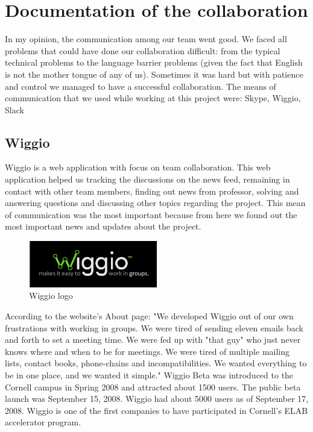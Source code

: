 \section{Documentation of the collaboration }
In my opinion, the communication among our team went good. We faced all problems that could have done our collaboration difficult: from the typical technical problems to the language barrier problems (given the fact that English is not the mother tongue of any of us). Sometimes it was hard but with patience and control we managed to have a successful collaboration.
The means of communication that we used while working at this project were: Skype, Wiggio, Slack

\subsection{Wiggio}
Wiggio is a web application with focus on team collaboration. This web application helped us tracking the discussions on the news feed, remaining in contact with other team members, finding out news from professor, solving and answering questions and discussing other topics regarding the project. This mean of communication was the most important because from here we found out the most important news and updates about the project.
\begin{figure}[h]
\centering
\caption{Wiggio logo}
\includegraphics[width=0.5\textwidth]{images/wiggio_logo_by_ibleedecw.jpg}
\end{figure}
According to the website's About page: "We developed Wiggio out of our own frustrations with working in groups. We were tired of sending eleven emails back and forth to set a meeting time. We were fed up with "that guy" who just never knows where and when to be for meetings. We were tired of multiple mailing lists, contact books, phone-chains and incompatibilities. We wanted everything to be in one place, and we wanted it simple."
Wiggio Beta was introduced to the Cornell campus in Spring 2008 and attracted about 1500 users. The public beta launch was September 15, 2008. Wiggio had about 5000 users as of September 17, 2008. Wiggio is one of the first companies to have participated in Cornell's ELAB accelerator program.
